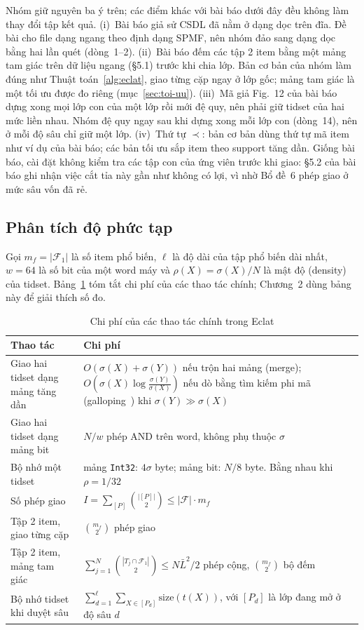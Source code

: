 Nhóm giữ nguyên ba ý trên; các điểm khác với bài báo dưới đây đều không làm thay đổi tập kết quả.
(i)~Bài báo giả sử CSDL đã nằm ở dạng dọc trên đĩa. Đề bài cho file dạng ngang theo định dạng SPMF, nên nhóm đảo sang dạng dọc bằng hai lần quét (dòng~1--2).
(ii)~Bài báo đếm các tập 2 item bằng một mảng tam giác trên dữ liệu ngang (§5.1) trước khi chia lớp. Bản cơ bản của nhóm làm đúng như Thuật toán~\ref{alg:eclat}, giao từng cặp ngay ở lớp gốc; mảng tam giác là một tối ưu được đo riêng (mục~\ref{sec:toi-uu}).
(iii)~Mã giả Fig.~12 của bài báo dựng xong mọi lớp con của một lớp rồi mới đệ quy, nên phải giữ tidset của hai mức liền nhau. Nhóm đệ quy ngay sau khi dựng xong mỗi lớp con (dòng~14), nên ở mỗi độ sâu chỉ giữ một lớp.
(iv)~Thứ tự $\prec$: bản cơ bản dùng thứ tự mã item như ví dụ của bài báo; các bản tối ưu sắp item theo support tăng dần.
Giống bài báo, cài đặt không kiểm tra các tập con của ứng viên trước khi giao: §5.2 của bài báo ghi nhận việc cắt tỉa này gần như không có lợi, vì nhờ Bổ đề~6 phép giao ở mức sâu vốn đã rẻ.

\subsection{Phân tích độ phức tạp}
\label{sec:do-phuc-tap}

Gọi $m_f = |\mathcal{F}_1|$ là số item phổ biến, $\ell$ là độ dài của tập phổ biến dài nhất, $w = 64$ là số bit của một word máy và $\rho(X) = \sigma(X)/N$ là mật độ (density) của tidset. Bảng~\ref{tab:do-phuc-tap} tóm tắt chi phí của các thao tác chính; Chương~2 dùng bảng này để giải thích số đo.

\begin{table}[t]
\caption{Chi phí của các thao tác chính trong Eclat}
\label{tab:do-phuc-tap}
\centering
\renewcommand{\arraystretch}{1.15}
\begin{tabular}{@{}p{2.25cm}p{5.75cm}@{}}
\toprule
Thao tác & Chi phí \\
\midrule
Giao hai tidset dạng mảng tăng dần & $O(\sigma(X) + \sigma(Y))$ nếu trộn hai mảng (merge); $O(\sigma(X) \log \frac{\sigma(Y)}{\sigma(X)})$ nếu dò bằng tìm kiếm phi mã (galloping~\cite{bentley1976almost}) khi $\sigma(Y) \gg \sigma(X)$ \\
Giao hai tidset dạng mảng bit & $N/w$ phép AND trên word, không phụ thuộc $\sigma$ \\
Bộ nhớ một tidset & mảng \texttt{Int32}: $4\sigma$ byte; mảng bit: $N/8$ byte. Bằng nhau khi $\rho = 1/32$ \\
Số phép giao & $I = \sum_{[P]} \binom{|[P]|}{2} \le |\mathcal{F}| \cdot m_f$ \\
Tập 2 item, giao từng cặp & $\binom{m_f}{2}$ phép giao \\
Tập 2 item, mảng tam giác & $\sum_{j=1}^{N} \binom{|T_j \cap \mathcal{F}_1|}{2} \le N \bar{L}^2/2$ phép cộng, $\binom{m_f}{2}$ bộ đếm \\
Bộ nhớ tidset khi duyệt sâu & $\sum_{d=1}^{\ell} \sum_{X \in [P_d]} \mathrm{size}(t(X))$, với $[P_d]$ là lớp đang mở ở độ sâu $d$ \\
\bottomrule
\end{tabular}
\end{table}

